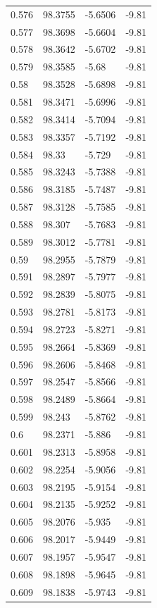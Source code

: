 \begin{tabular}{llll}
0.576 & 98.3755 & -5.6506 & -9.81 \\
0.577 & 98.3698 & -5.6604 & -9.81 \\
0.578 & 98.3642 & -5.6702 & -9.81 \\
0.579 & 98.3585 & -5.68 & -9.81 \\
0.58 & 98.3528 & -5.6898 & -9.81 \\
0.581 & 98.3471 & -5.6996 & -9.81 \\
0.582 & 98.3414 & -5.7094 & -9.81 \\
0.583 & 98.3357 & -5.7192 & -9.81 \\
0.584 & 98.33 & -5.729 & -9.81 \\
0.585 & 98.3243 & -5.7388 & -9.81 \\
0.586 & 98.3185 & -5.7487 & -9.81 \\
0.587 & 98.3128 & -5.7585 & -9.81 \\
0.588 & 98.307 & -5.7683 & -9.81 \\
0.589 & 98.3012 & -5.7781 & -9.81 \\
0.59 & 98.2955 & -5.7879 & -9.81 \\
0.591 & 98.2897 & -5.7977 & -9.81 \\
0.592 & 98.2839 & -5.8075 & -9.81 \\
0.593 & 98.2781 & -5.8173 & -9.81 \\
0.594 & 98.2723 & -5.8271 & -9.81 \\
0.595 & 98.2664 & -5.8369 & -9.81 \\
0.596 & 98.2606 & -5.8468 & -9.81 \\
0.597 & 98.2547 & -5.8566 & -9.81 \\
0.598 & 98.2489 & -5.8664 & -9.81 \\
0.599 & 98.243 & -5.8762 & -9.81 \\
0.6 & 98.2371 & -5.886 & -9.81 \\
0.601 & 98.2313 & -5.8958 & -9.81 \\
0.602 & 98.2254 & -5.9056 & -9.81 \\
0.603 & 98.2195 & -5.9154 & -9.81 \\
0.604 & 98.2135 & -5.9252 & -9.81 \\
0.605 & 98.2076 & -5.935 & -9.81 \\
0.606 & 98.2017 & -5.9449 & -9.81 \\
0.607 & 98.1957 & -5.9547 & -9.81 \\
0.608 & 98.1898 & -5.9645 & -9.81 \\
0.609 & 98.1838 & -5.9743 & -9.81 \\

\end{tabular}
